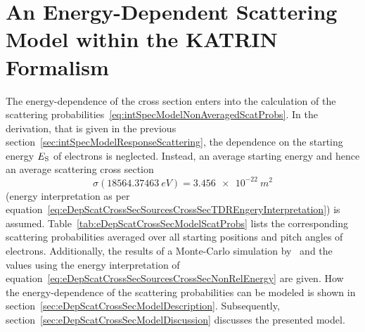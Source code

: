 \section{An Energy-Dependent Scattering Model within the KATRIN Formalism}
\label{sec:eDepScatCrossSecModel}
The energy-dependence of the cross section enters into the calculation of the scattering probabilities~\eqref{eq:intSpecModelNonAveragedScatProbs}. In the derivation, that is given in the previous section~\ref{sec:intSpecModelResponseScattering}, the dependence on the starting energy $E_\mathrm{S}$ of electrons is neglected. Instead, an average starting energy and hence an average scattering cross section
\begin{equation}
	\label{eq:eDepScatCrossSecModelTRDCrossSec}
	\sigma(\SI{18564.37463}{eV})=\SI{3.456e-22}{m^2}
\end{equation}  (energy interpretation as per equation~\ref{eq:eDepScatCrossSecSourcesCrossSecTDREngeryInterpretation}) is assumed. Table~\ref{tab:eDepScatCrossSecModelScatProbs} lists the corresponding scattering probabilities averaged over all starting positions and pitch angles of electrons. Additionally, the results of a Monte-Carlo simulation by~\cite{Groh2015} and the values using the energy interpretation of equation~\eqref{eq:eDepScatCrossSecSourcesCrossSecNonRelEnergy} are given. How the energy-dependence of the scattering probabilities can be modeled is shown in section~\ref{sec:eDepScatCrossSecModelDescription}.  Subsequently, section~\ref{sec:eDepScatCrossSecModelDiscussion} discusses the presented model.

